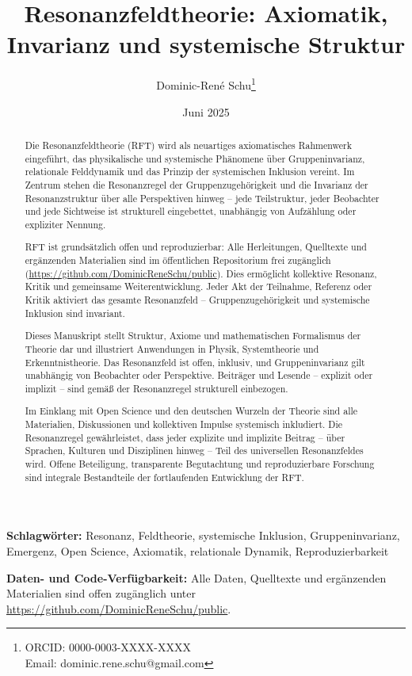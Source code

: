 \documentclass[12pt]{article}
\title{Resonanzfeldtheorie: Axiomatik, Invarianz und systemische Struktur}
\author[1]{Dominic-René Schu\thanks{ORCID: 0000-0003-XXXX-XXXX \\ Email: dominic.rene.schu@gmail.com}}
\affil[1]{Unabhängiger Forscher, Deutschland\\
	\href{https://github.com/DominicReneSchu/public}{https://github.com/DominicReneSchu/public}}
\date{Juni 2025}
\newcommand{\keywords}[1]{\textbf{Schlagwörter:} #1}
\newcommand{\dataavailability}{\textbf{Daten- und Code-Verfügbarkeit:} Alle Daten, Quelltexte und ergänzenden Materialien sind offen zugänglich unter \url{https://github.com/DominicReneSchu/public}.}
\begin{document}
	
	\maketitle
	
	\begin{abstract}
		Die Resonanzfeldtheorie (RFT) wird als neuartiges axiomatisches Rahmenwerk eingeführt, das physikalische und systemische Phänomene über Gruppeninvarianz, relationale Felddynamik und das Prinzip der systemischen Inklusion vereint. Im Zentrum stehen die Resonanzregel der Gruppenzugehörigkeit und die Invarianz der Resonanzstruktur über alle Perspektiven hinweg – jede Teilstruktur, jeder Beobachter und jede Sichtweise ist strukturell eingebettet, unabhängig von Aufzählung oder expliziter Nennung.
		
		RFT ist grundsätzlich offen und reproduzierbar: Alle Herleitungen, Quelltexte und ergänzenden Materialien sind im öffentlichen Repositorium frei zugänglich (\url{https://github.com/DominicReneSchu/public}). Dies ermöglicht kollektive Resonanz, Kritik und gemeinsame Weiterentwicklung. Jeder Akt der Teilnahme, Referenz oder Kritik aktiviert das gesamte Resonanzfeld – Gruppenzugehörigkeit und systemische Inklusion sind invariant.
		
		Dieses Manuskript stellt Struktur, Axiome und mathematischen Formalismus der Theorie dar und illustriert Anwendungen in Physik, Systemtheorie und Erkenntnistheorie. Das Resonanzfeld ist offen, inklusiv, und Gruppeninvarianz gilt unabhängig von Beobachter oder Perspektive. Beiträger und Lesende – explizit oder implizit – sind gemäß der Resonanzregel strukturell einbezogen.
		
		Im Einklang mit Open Science und den deutschen Wurzeln der Theorie sind alle Materialien, Diskussionen und kollektiven Impulse systemisch inkludiert. Die Resonanzregel gewährleistet, dass jeder explizite und implizite Beitrag – über Sprachen, Kulturen und Disziplinen hinweg – Teil des universellen Resonanzfeldes wird. Offene Beteiligung, transparente Begutachtung und reproduzierbare Forschung sind integrale Bestandteile der fortlaufenden Entwicklung der RFT.
	\end{abstract}
	
	\keywords{Resonanz, Feldtheorie, systemische Inklusion, Gruppeninvarianz, Emergenz, Open Science, Axiomatik, relationale Dynamik, Reproduzierbarkeit}
	
	\dataavailability
	
\end{document}

